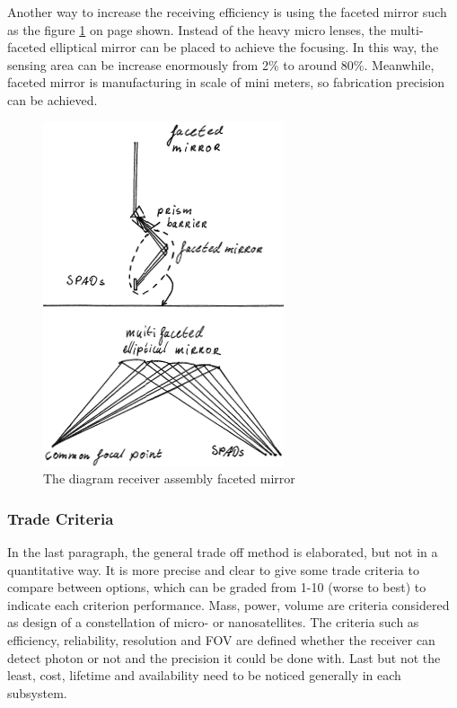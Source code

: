Another way to increase the receiving efficiency is using the faceted mirror such as the figure \ref{fig:diagram_Rfaceted mirror} on page \pageref{fig:diagram_Rfaceted mirror} shown. Instead of the heavy micro lenses, the multi-faceted elliptical mirror can be placed to achieve the focusing. In this way, the sensing area can be increase enormously from 2\% to around 80\%. Meanwhile, faceted mirror is manufacturing in scale of mini meters, so fabrication precision can be achieved.

\begin{figure}[ht!]
\centering
\includegraphics[scale = 0.6]{chapters/img/DiagramReceiverAssemblyFacetedMirror.png}
\caption{The diagram receiver assembly faceted mirror}
\label{fig:diagram_Rfaceted mirror}
\end{figure}

\subsubsection{Trade Criteria}
\label{TOReceiverC}
In the last paragraph, the general trade off method is elaborated, but not in a quantitative way. It is more precise and clear to give some trade criteria to compare between options, which can be graded from 1-10 (worse to best) to indicate each criterion performance. Mass, power, volume are criteria considered as design of a constellation of micro- or nanosatellites. The criteria such as efficiency, reliability, resolution and \ac{FOV} are defined whether the receiver can detect photon or not and the precision it could be done with. Last but not the least, cost, lifetime and availability need to be noticed generally in each subsystem.

